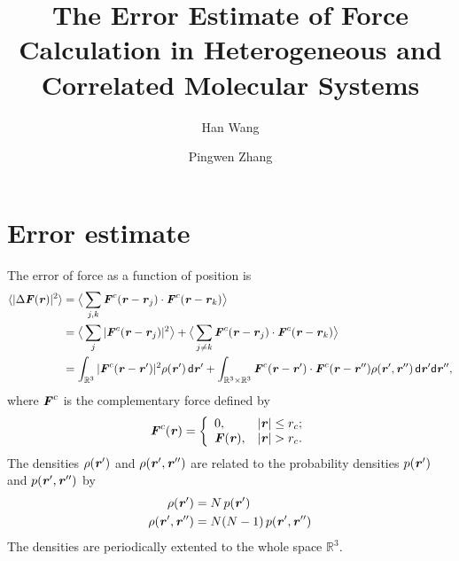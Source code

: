 \documentclass[aps,pre,preprint]{revtex4}
\renewcommand{\v}[1]{\textbf{\textit{#1}}}
\renewcommand{\d}[1]{\textsf{#1}}
\begin{document}
\title{The Error Estimate of Force Calculation in Heterogeneous and Correlated Molecular Systems}
\author{Han Wang}
\author{Pingwen Zhang}

\begin{abstract}
\end{abstract}

\maketitle


\section{Error estimate}
The error of force as a function of position is 
\begin{align} \nonumber
  \langle\vert\Delta\v F(\v r)\vert^2\rangle
  &= \big\langle\sum_{j,k}\v F^c(\v r - \v r_j)\cdot\v F^c(\v r - \v r_k)\big\rangle \\ \nonumber
  &= \big\langle\sum_j\vert\v F^c(\v r - \v r_j)\vert^2\big\rangle +
  \big\langle\sum_{j\neq k}\v F^c(\v r - \v r_j)\cdot\v F^c(\v r - \v r_k)\big\rangle \\ \label{eqn:tmp1}
  &= \int_{\mathbb R^3}\vert\v F^c(\v r - \v r')\vert^2\rho(\v r')\,\d d\v r'
  + \int_{\mathbb R^3\times\mathbb R^3}\v F^c(\v r - \v r')\cdot\v F^c(\v r - \v r'')\rho(\v r', \v r'')\,\d d\v r'\d d\v r'',
\end{align}
where $\v F^c$ is the complementary force defined by
\begin{align}
  \v F^c(\v r) =
  \left\{
  \begin{array}{ll}
    0, & \vert\v r\vert\leq r_c; \\
    \v F(\v r), & \vert\v r\vert > r_c.
  \end{array}
  \right.
\end{align}
The densities $\rho(\v r')$ and $\rho(\v r', \v r'')$ are related
to the probability densities $p(\v r')$ and $p(\v r', \v r'')$ by
\begin{align}
  \rho(\v r') &= N\,p(\v r') \\
  \rho(\v r', \v r'') &= N(N-1)\,p(\v r', \v r'')
\end{align}
The densities are periodically extented to the whole space $\mathbb
R^3$.
\end{document}
